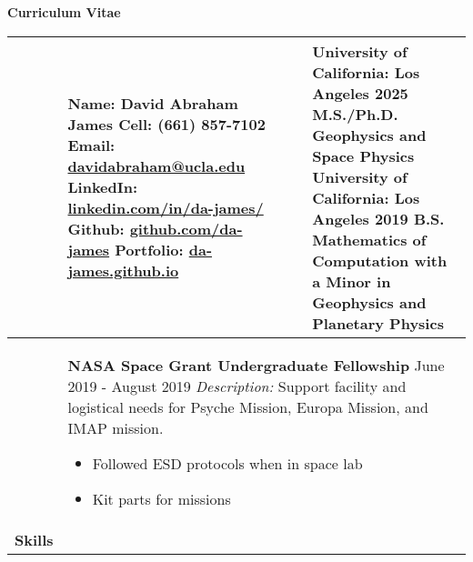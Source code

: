 \documentclass[10pt]{article}
\newcommand*\leftright[2]{%
  \leavevmode
  \rlap{#1}%
  \hspace{0.5\linewidth}%
  #2}
\begin{document}
{\centering
    \textbf{\large Curriculum Vitae} \\
}
\begin{longtable}{l l l l} \hline
    \multicolumn{1}{p{1.7 cm}}{\textbf{\vspace{Contact Info.}}}    &    
    
        \multicolumn{1}{p{7cm}}{
        \textbf{Name:} David Abraham James \newline
        \textbf{Cell: } (661) 857-7102 \newline
        \textbf{Email: } \href{mailto:davidabraham@ucla.edu}{davidabraham@ucla.edu} \newline
        \textbf{LinkedIn: } \href{https://www.linkedin.com/in/da-james/}{linkedin.com/in/da-james/} \newline
        \textbf{Github: } \href{https://github.com/da-james}{github.com/da-james} \newline
        \textbf{Portfolio: } \href{https://da-james.github.io}{da-james.github.io}} &
        \multicolumn{1}{p{1.5cm}}{\textbf{\vspace{Education}}}  &
            \multicolumn{1}{p{7.4cm}}{
            \textbf{University of California: Los Angeles 2025} \newline
            M.S./Ph.D. Geophysics and Space Physics \newline
            \textbf{University of California: Los Angeles 2019} \newline
            B.S. Mathematics of Computation  with a \newline
            Minor in Geophysics and Planetary Physics} \\ \hline

    \multicolumn{1}{p{1.7cm}}{
    \textbf{\vspace{Awards}}}    &                
    
        \multicolumn{3}{p{17cm}}{
        \textbf{NASA Space Grant Undergraduate Fellowship} \newline
        \leftright{\textit{Lab Assistant}}{June 2019 - August 2019} \newline
        \textit{Description:} Support facility and logistical needs for Psyche Mission, Europa Mission, and IMAP mission.
        \begin{itemize}[noitemsep,nolistsep]
            \item Followed ESD protocols when in space lab
            \item Kit parts for missions
        \end{itemize}
       \baselineskip } \\ \hline
    \multicolumn{1}{p{1.7cm}}{\textbf{Skills}}   &
    

\end{longtable}
\end{document}
